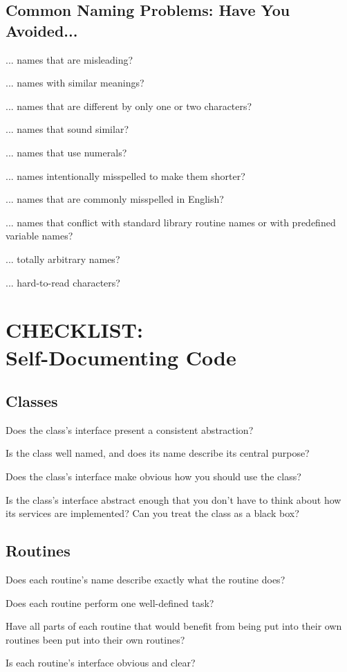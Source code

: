 \begin{multicols}{2}
\subsection*{Common Naming Problems: Have You Avoided...}
\begin{todolist}
  \item ... names that are misleading?
  \item ... names with similar meanings?
  \item ... names that are different by only one or two characters?
  \item ... names that sound similar?
  \item ... names that use numerals?
  \item ... names intentionally misspelled to make them shorter?
  \item ... names that are commonly misspelled in English?
  \item ... names that conflict with standard library routine names or with predefined variable names?
  \item ... totally arbitrary names?
  \item ... hard-to-read characters?
\end{todolist}

\section*{CHECKLIST:\\Self-Documenting Code}

\subsection*{Classes}
\begin{todolist}
  \item Does the class's interface present a consistent abstraction?
  \item Is the class well named, and does its name describe its central purpose?
  \item Does the class's interface make obvious how you should use the class?
  \item Is the class's interface abstract enough that you don't have to think about how its services are implemented? Can you treat the class as a black box?
\end{todolist}

\subsection*{Routines}
\begin{todolist}
  \item Does each routine's name describe exactly what the routine does?
  \item Does each routine perform one well-defined task?
  \item Have all parts of each routine that would benefit from being put into their own routines been put into their own routines?
  \item Is each routine's interface obvious and clear?
\end{todolist}


\end{multicols}
